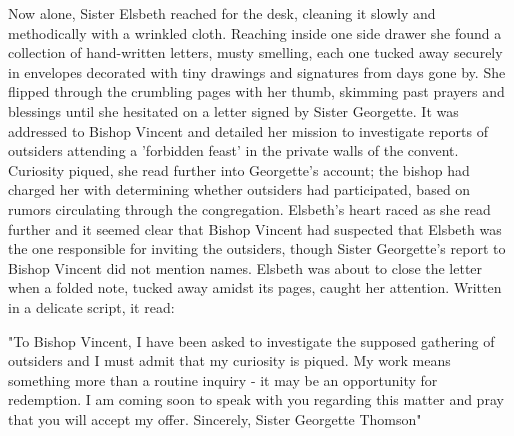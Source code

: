 \documentclass[11pt]{article}
\begin{document}
Now alone, Sister Elsbeth reached for the desk, cleaning it slowly and methodically with a wrinkled cloth. Reaching inside one side drawer she found a collection of hand-written letters, musty smelling, each one tucked away securely in envelopes decorated with tiny drawings and signatures from days gone by. She flipped through the crumbling pages with her thumb, skimming past prayers and blessings until she hesitated on a letter signed by Sister Georgette. It was addressed to Bishop Vincent and detailed her mission to investigate reports of outsiders attending a 'forbidden feast' in the private walls of the convent. Curiosity piqued, she read further into Georgette's account; the bishop had charged her with determining whether outsiders had participated, based on rumors circulating through the congregation.
Elsbeth's heart raced as she read further and it seemed clear that Bishop Vincent had suspected that Elsbeth was the one responsible for inviting the outsiders, though Sister Georgette's report to Bishop Vincent did not mention names. Elsbeth was about to close the letter when a folded note, tucked away amidst its pages, caught her attention. Written in a delicate script, it read:

"To Bishop Vincent,
I have been asked to investigate the supposed gathering of outsiders and I must admit that my curiosity is piqued. My work means something more than a routine inquiry - it may be an opportunity for redemption. I am coming soon to speak with you regarding this matter and pray that you will accept my offer.
Sincerely,
Sister Georgette Thomson"
\end{document}
